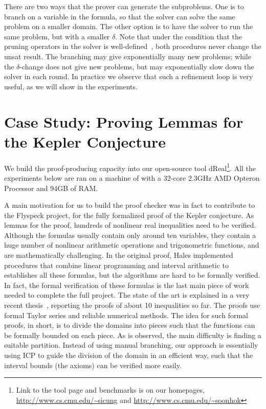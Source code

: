 \documentclass[envcountsect]{llncs}
\begin{document}
There are two ways that the prover can generate the subproblems. One is to
branch on a variable in the formula, so that the solver can solve the same
problem on a smaller domain. The other option is to have the solver to run the
same problem, but with a smaller $\delta$. Note that under the condition that
the pruning operators in the solver is
well-defined~\cite{}, both procedures never change the
{\sf unsat} result. The branching may give
exponentially many new problems; while the $\delta$-change does not give new
problems, but may exponentially slow down the solver in each round. In practice
we observe that such a refinement loop is very useful, as we will show in the
experiments. 

\section{Case Study: Proving Lemmas for the Kepler Conjecture}\label{kepler}

We build the proof-producing capacity into our open-source tool
dReal\footnote{Link to the
tool page and benchmarks is on our homepages,
\url{http://www.cs.cmu.edu/~sicung} and
\url{http://www.cs.cmu.edu/~soonhok}}. All the experiments below are ran on a
machine of with a 32-core 2.3GHz AMD Opteron Processor and 94GB of RAM.




A main motivation for us to build
the proof checker was in fact to contribute to the Flyspeck project, for the
fully formalized proof of the Kepler conjecture. As lemmas for the proof,
hundreds of nonlinear real inequalities need to be verified. Although the
formulas usually contain only around ten variables, they contain a huge number
of nonlinear arithmetic operations and trigonometric functions, and are
mathematically challenging. In the original proof, Hales implemented
procedures that combine linear programming and interval arithmetic to
establishes all these formulas, but the algorithms are hard to be formally
verified. In fact, the formal verification of these formulas is the last main
piece of work needed to complete the full project. The state of the art is
explained in a very recent thesis~\cite{keplerthesis}, reporting the proofs of about 10
inequalities so far. The proofs use formal Taylor series and reliable
numerical methods. The idea for such formal proofs, in short, is to divide the
domains into pieces such that the functions can be formally bounded on each
piece. As is observed, the main difficulty is finding a suitable
partition. Instead of using manual branching, our approach is
essentially using ICP to guide the division of the domain in an efficient way,
such that the interval bounds (the axioms) can be verified more easily. 
\end{document}
